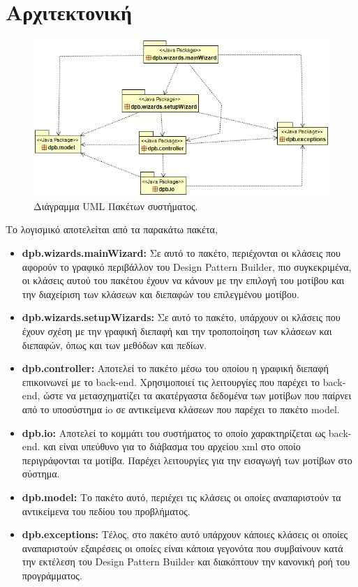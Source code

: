 \section{Αρχιτεκτονική}
\label{sec:packages}
\begin{figure}[H]
    \centering
    \includegraphics[width=1.0\textwidth]{Figures/packages.png}
    \caption{Διάγραμμα UML Πακέτων συστήματος.}
    \label{fig:packageUML}
\end{figure}
\par
Το λογισμικό αποτελείται από τα παρακάτω πακέτα,
\begin{itemize}
    \item \textbf{dpb.wizards.mainWizard:} Σε αυτό το πακέτο, περιέχονται οι κλάσεις που αφορούν το γραφικό περιβάλλον του Design Pattern Builder,
     πιο συγκεκριμένα, οι κλάσεις αυτού του πακέτου έχουν να κάνουν με την επιλογή του μοτίβου και την διαχείριση των κλάσεων και διεπαφών του 
     επιλεγμένου μοτίβου.
    \item \textbf{dpb.wizards.setupWizards:} Σε αυτό το πακέτο, υπάρχουν οι κλάσεις που έχουν σχέση με την γραφική διεπαφή και την τροποποίηση των κλάσεων και διεπαφών, 
    όπως και των μεθόδων και πεδίων.
    \item \textbf{dpb.controller:} Αποτελεί το πακέτο μέσω του οποίου η γραφική διεπαφή επικοινωνεί με το back-end. Χρησιμοποιεί τις λειτουργίες που παρέχει το back-end, 
    ώστε να  μετασχηματίζει τα ακατέργαστα δεδομένα των μοτίβων που παίρνει από το υποσύστημα io σε αντικείμενα κλάσεων που παρέχει το πακέτο model.
    \item \textbf{dpb.io:} Αποτελεί το κομμάτι του συστήματος το οποίο χαρακτηρίζεται ως back-end.
     και είναι υπεύθυνο για το διάβασμα του αρχείου xml στο οποίο περιγράφονται τα μοτίβα. 
     Παρέχει λειτουργίες για την εισαγωγή των μοτίβων στο σύστημα.
    \item \textbf{dpb.model:} Το πακέτο αυτό, περιέχει τις κλάσεις οι οποίες αναπαριστούν τα αντικείμενα του πεδίου του προβλήματος.
    \item \textbf{dpb.exceptions:} Τέλος, στο πακέτο αυτό υπάρχουν κάποιες κλάσεις οι οποίες αναπαριστούν εξαιρέσεις 
        οι οποίες είναι κάποια γεγονότα που συμβαίνουν κατά την εκτέλεση του Design Pattern Builder και διακόπτουν την κανονική ροή του προγράμματος.
\end{itemize}
